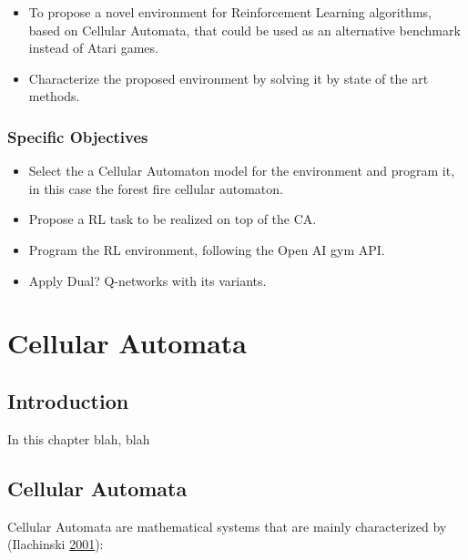 \documentclass[
]{book}
\providecommand{\tightlist}{%
  \setlength{\itemsep}{0pt}\setlength{\parskip}{0pt}}
\begin{document}
\begin{itemize}
\tightlist
\item
  To propose a novel environment for Reinforcement Learning algorithms, based on Cellular Automata, that could be used as an alternative benchmark instead of Atari games.
\item
  Characterize the proposed environment by solving it by state of the art methods.
\end{itemize}

\hypertarget{specific-objectives}{%
\subsection{Specific Objectives}\label{specific-objectives}}

\begin{itemize}
\tightlist
\item
  Select the a Cellular Automaton model for the environment and program it, in this case the forest fire cellular automaton.
\item
  Propose a RL task to be realized on top of the CA.
\item
  Program the RL environment, following the Open AI gym API.
\item
  Apply Dual? Q-networks with its variants.
\end{itemize}

\hypertarget{cellular-automata}{%
\chapter{Cellular Automata}\label{cellular-automata}}

\hypertarget{introduction-1}{%
\section{Introduction}\label{introduction-1}}

In this chapter blah, blah

\hypertarget{cellular-automata-1}{%
\section{Cellular Automata}\label{cellular-automata-1}}

Cellular Automata are mathematical systems that are mainly characterized by (Ilachinski \protect\hyperlink{ref-ilachinski2001cellular}{2001}):
\end{document}
